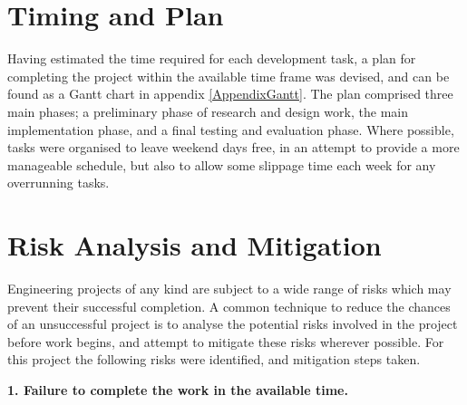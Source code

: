 
\section{Timing and Plan}

Having estimated the time required for each development task, a plan for completing the project within the available time frame was devised, and can be found as a Gantt chart in appendix \ref{AppendixGantt}. The plan comprised three main phases; a preliminary phase of research and design work, the main implementation phase, and a final testing and evaluation phase. Where possible, tasks were organised to leave weekend days free, in an attempt to provide a more manageable schedule, but also to allow some slippage time each week for any overrunning tasks.


\section{Risk Analysis and Mitigation}

Engineering projects of any kind are subject to a wide range of risks which may prevent their successful completion. A common technique to reduce the chances of an unsuccessful project is to analyse the potential risks involved in the project before work begins, and attempt to mitigate these risks wherever possible. For this project the following risks were identified, and mitigation steps taken.

\clearpage
\noindent\textbf{1. Failure to complete the work in the available time.}

